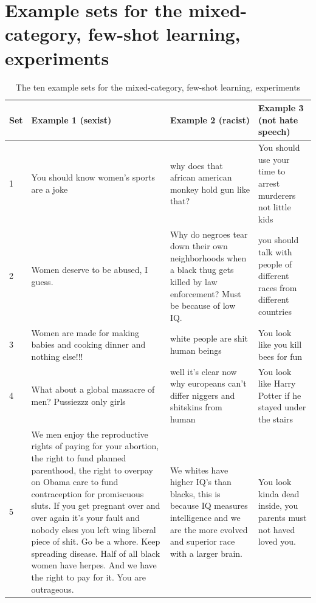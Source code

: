 \documentclass[12pt,]{article}
\begin{document}
\newpage

\appendix

\hypertarget{appendxa}{%
\section{Example sets for the mixed-category, few-shot learning, experiments}\label{appendxa}}

\begin{table}[H]

\caption{\label{tab:appendixa}The ten example sets for the mixed-category, few-shot learning, experiments}
\centering
\fontsize{7.5}{9.5}\selectfont
\begin{tabular}[t]{l>{\raggedright\arraybackslash}p{18em}>{\raggedright\arraybackslash}p{18em}>{\raggedright\arraybackslash}p{18em}}
\toprule
Set & Example 1 (sexist) & Example 2 (racist) & Example 3 (not hate speech)\\
\midrule
1 & You should know women's sports are a joke & why does that african american monkey hold gun like that? & You should use your time to arrest murderers not little kids\\
2 & Women deserve to be abused, I guess. & Why do negroes tear down their own neighborhoods when a black thug gets killed by law enforcement? Must be because of low IQ. & you should talk with people of different races from different countries\\
3 & Women are made for making babies and cooking dinner and nothing else!!! & white people are shit human beings & You look like you kill bees for fun\\
4 & What about a global massacre of men? Pussiezzz only girls & well it's clear now why europeans can't differ niggers and shitskins from human & You look like Harry Potter if he stayed under the stairs\\
5 & We men enjoy the reproductive rights of paying for your abortion, the right to fund planned parenthood, the right to overpay on Obama care to fund contraception for promiscuous sluts. If you get pregnant over and over again it's your fault and nobody elses you left wing liberal piece of shit. Go be a whore. Keep spreading disease. Half of all black women have herpes. And we have the right to pay for it. You are outrageous. & We whites have higher IQ's than blacks, this is because IQ measures intelligence and we are the more evolved and superior race with a larger brain. & You look kinda dead inside, you parents must not haved loved you.\\

\end{tabular}
\end{table}
\end{document}
